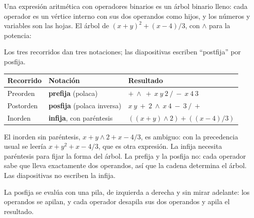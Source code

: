 \documentclass[11pt,letterpaper]{article}
\begin{document}
Una expresión aritmética con operadores binarios es un árbol binario
lleno: cada operador es un vértice interno con sus dos operandos como
hijos, y los números y variables son las hojas. El árbol de
$(x + y)^2 + (x - 4)/3$, con $\wedge$ para la potencia:
\begin{center}
\end{center}
Los tres recorridos dan tres notaciones; las diapositivas escriben
``postfija'' por posfija.
\begin{center}
\small
\begin{tabular}{lll}
  \toprule
  \textbf{Recorrido} & \textbf{Notación} & \textbf{Resultado} \\
  \midrule
  Preorden & \textbf{prefija} (polaca)
    & ${+}\ {\wedge}\ {+}\ x\ y\ 2\ {/}\ {-}\ x\ 4\ 3$ \\
  Postorden & \textbf{posfija} (polaca inversa)
    & $x\ y\ {+}\ 2\ {\wedge}\ x\ 4\ {-}\ 3\ {/}\ {+}$ \\
  Inorden & \textbf{infija}, con paréntesis
    & $((x + y) \wedge 2) + ((x - 4) / 3)$ \\
  \bottomrule
\end{tabular}
\end{center}

\begin{ojo}
  El inorden sin paréntesis, $x + y \wedge 2 + x - 4 / 3$, es ambiguo:
  con la precedencia usual se leería $x + y^2 + x - 4/3$, que es otra
  expresión. La infija necesita paréntesis para fijar la forma del
  árbol. La prefija y la posfija no: cada operador sabe que lleva
  exactamente dos operandos, así que la cadena determina el árbol.
  Las diapositivas no escriben la infija.
\end{ojo}

La posfija se evalúa con una pila, de izquierda a derecha y sin mirar
adelante: los operandos se apilan, y cada operador desapila sus dos
operandos y apila el resultado.
\end{document}
